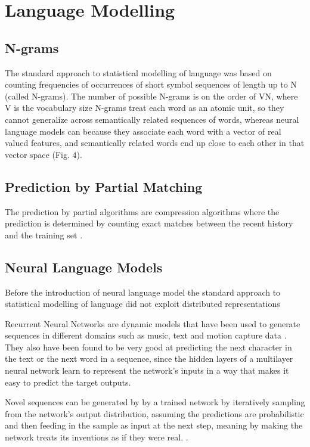\section{Language Modelling}
\subsection{N-grams}
The standard approach to statistical modelling of language was based on counting frequencies of occurrences of short symbol sequences of length up to N (called N-grams). The number of possible N-grams is on the order of VN, where V is the vocabulary size N-grams treat each word as an atomic unit, so they cannot generalize across semantically related sequences of words, whereas neural language models can because they associate each word with a vector of real valued features, and semantically related words end up close to each other in that vector space (Fig. 4).\cite{lecun2015deep}

\subsection{Prediction by Partial Matching}
The prediction by partial algorithms are compression algorithms where the prediction is determined by counting exact matches between the recent history and the training set \cite{graves2013generating}.
    
\subsection{Neural Language Models}
Before the introduction of neural language model the standard approach to statistical modelling of language did not exploit distributed representations\cite{lecun2015deep}

Recurrent Neural Networks are dynamic models that have been used to generate sequences in different domains such as music, text and motion capture data \cite{graves2013generating}.
They also have been found to be very good at predicting the next character in the text or the next word in a sequence, since the hidden layers of a multilayer neural network learn to represent the network’s inputs in a way that makes it easy to predict the target outputs.\cite{lecun2015deep}

Novel sequences can be generated by by a trained network by iteratively sampling from the network's output distribution, assuming the predictions are probabilistic and then feeding in the sample as input at the next step, meaning by making the network treats its inventions as if they were real. 
\cite{graves2013generating}.


